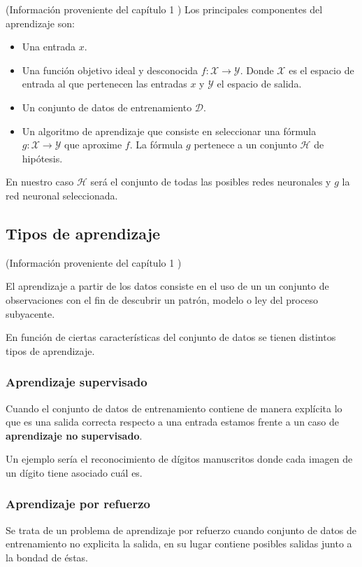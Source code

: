 (Información proveniente del capítulo 1 \cite{MostafaLearningFromData})
Los principales componentes del aprendizaje son: 

\begin{itemize}
    \item Una entrada $x$. 
    \item Una función objetivo ideal y desconocida
     $f: \mathcal X \longrightarrow \mathcal{Y}$. 
     Donde  $\mathcal X$ es el espacio de entrada al que pertenecen las entradas $x$ y $\mathcal{Y}$ el espacio de salida. 
    \item Un conjunto de datos de entrenamiento $\mathcal D.$
    \item Un algoritmo de aprendizaje que consiste en seleccionar una fórmula $g: \mathcal X \longrightarrow \mathcal{Y}$ que aproxime $f$. La fórmula $g$ pertenece 
    a un conjunto $\mathcal H$ de hipótesis. 
\end{itemize}

En nuestro caso $\mathcal{H}$ será el conjunto de todas las posibles redes neuronales y $g$ la red neuronal seleccionada. 


\subsection{Tipos de aprendizaje}  

(Información proveniente del capítulo 1 \cite{MostafaLearningFromData})

El aprendizaje a partir de los datos consiste en el uso de un 
un conjunto de observaciones con el fin de descubrir un patrón, modelo o ley del proceso subyacente. 

En función de ciertas características del conjunto de datos se 
tienen distintos tipos de aprendizaje.  

\subsubsection{Aprendizaje supervisado}
Cuando el conjunto de datos de entrenamiento contiene de manera explícita lo que es una salida correcta respecto a una entrada estamos frente a un caso de \textbf{aprendizaje no supervisado}.   

Un ejemplo sería el reconocimiento de dígitos  manuscritos donde cada imagen de un dígito tiene asociado cuál es. 


\subsubsection{Aprendizaje por refuerzo}  
Se trata de un problema de aprendizaje por refuerzo 
cuando conjunto de datos de entrenamiento no explicita la salida, en su lugar contiene posibles salidas junto a la bondad de éstas. 

